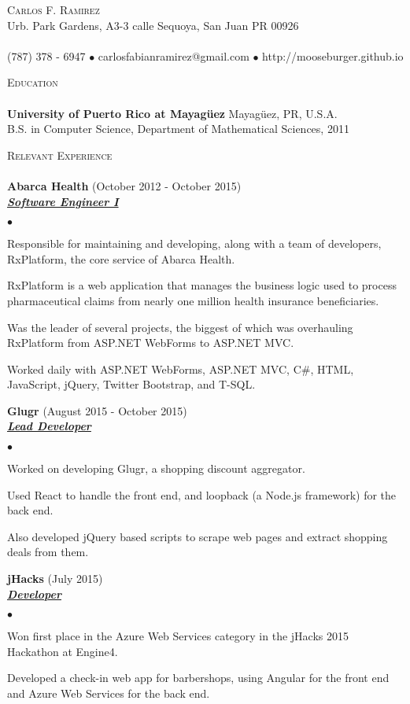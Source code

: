 \documentclass{article}
\newcommand{\lineunder}{\vspace*{-8pt} \\ \hspace*{-18pt} \hrulefill \\}
\newcommand{\header}[1]{{\hspace*{-15pt}\vspace*{6pt} \textsc{#1}} \vspace*{-6pt} \lineunder}
\newcommand{\employer}[3]{{ \textbf{#1} (#2)\\ \underline{\textbf{\emph{#3}}}\\  }}
\newcommand{\contact}[3]{
\vspace*{-8pt}
\begin{center}
{\LARGE \scshape {#1}}\\
#2 \lineunder 
#3
\end{center}
\vspace*{-8pt}
}
\newenvironment{achievements}{\begin{list}{$\bullet$}{\topsep 0pt \itemsep -2pt}}{\vspace*{4pt}\end{list}}
\newcommand{\school}[2]{
 \textbf{#1} #2 \\
}
\begin{document}
\small
\smallskip
\vspace*{-44pt}

\contact{Carlos F. Ramirez}
{Urb. Park Gardens, A3-3 calle Sequoya, San Juan PR 00926}
{(787) 378 - 6947 $\bullet$ carlosfabianramirez@gmail.com $\bullet$ http://mooseburger.github.io}

\header{Education}

\school{University of Puerto Rico at Mayag\"{u}ez}{Mayag\"{u}ez, PR, U.S.A.}{B.S. in Computer Science, Department of Mathematical Sciences, 2011}

\header{Relevant Experience}

\employer{Abarca Health}{October 2012 - October 2015}{Software Engineer I}
	\begin{achievements}
	\item Responsible for maintaining and developing, along with a team of developers, RxPlatform, the core service of Abarca Health.
	\item RxPlatform is a web application that manages the business logic used to process pharmaceutical claims from nearly one million health insurance beneficiaries.
	\item Was the leader of several projects, the biggest of which was overhauling RxPlatform from ASP.NET WebForms to ASP.NET MVC. 	
	\item Worked daily with ASP.NET WebForms, ASP.NET MVC, C\string#, HTML, JavaScript, jQuery, Twitter Bootstrap, and T-SQL. 
	\end{achievements}

\employer{Glugr}{August 2015 - October 2015}{Lead Developer}
	\begin{achievements}
	\item Worked on developing Glugr, a shopping discount aggregator.
	\item Used React to handle the front end, and loopback (a Node.js framework) for the back end.
	\item Also developed jQuery based scripts to scrape web pages and extract shopping deals from them. 
	\end{achievements}

\employer{jHacks}{July 2015}{Developer}
	\begin{achievements}
	\item Won first place in the Azure Web Services category in the jHacks 2015 Hackathon at Engine4.
	\item Developed a check-in web app for barbershops, using Angular for the front end and Azure Web Services for the back end.
	\end{achievements}
\end{document}
